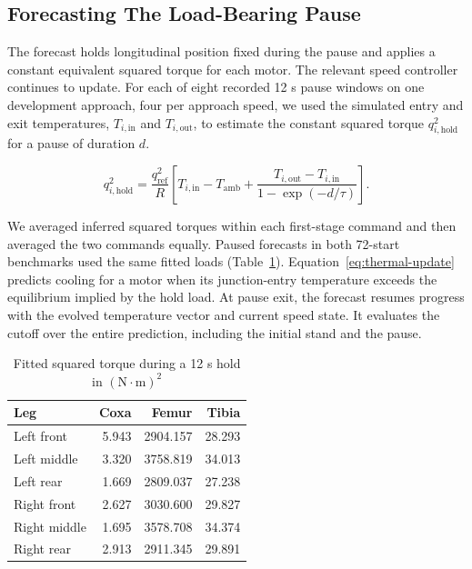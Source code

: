 \documentclass{ieeeaccess}
\begin{document}
\subsection{Forecasting The Load-Bearing Pause}

The forecast holds longitudinal position fixed during the pause and applies a constant equivalent squared torque for each motor. The relevant speed controller continues to update. For each of eight recorded 12 s pause windows on one development approach, four per approach speed, we used the simulated entry and exit temperatures, $T_{i,\mathrm{in}}$ and $T_{i,\mathrm{out}}$, to estimate the constant squared torque $q_{i,\mathrm{hold}}^2$ for a pause of duration $d$.

\begin{equation}
q_{i,\mathrm{hold}}^2 =
\frac{q_{\mathrm{ref}}^2}{R}
\left[T_{i,\mathrm{in}}-T_{\mathrm{amb}}+
\frac{T_{i,\mathrm{out}}-T_{i,\mathrm{in}}}{1-\exp(-d/\tau)}\right].
\end{equation}

We averaged inferred squared torques within each first-stage command and then averaged the two commands equally. Paused forecasts in both 72-start benchmarks used the same fitted loads (Table~\ref{tab:hold-loads}). Equation~\eqref{eq:thermal-update} predicts cooling for a motor when its junction-entry temperature exceeds the equilibrium implied by the hold load. At pause exit, the forecast resumes progress with the evolved temperature vector and current speed state. It evaluates the cutoff over the entire prediction, including the initial stand and the pause.

\begin{table}[!t]
\caption{Fitted squared torque during a 12 s hold in $(\mathrm{N}{\cdot}\mathrm{m})^2$}
\label{tab:hold-loads}
\centering
\footnotesize
\renewcommand{\arraystretch}{1.12}
\begin{tabular}{@{}lrrr@{}}
\hline
Leg & Coxa & Femur & Tibia \\
\hline
Left front & 5.943 & 2904.157 & 28.293 \\
Left middle & 3.320 & 3758.819 & 34.013 \\
Left rear & 1.669 & 2809.037 & 27.238 \\
Right front & 2.627 & 3030.600 & 29.827 \\
Right middle & 1.695 & 3578.708 & 34.374 \\
Right rear & 2.913 & 2911.345 & 29.891 \\
\hline
\end{tabular}
\end{table}
\end{document}
